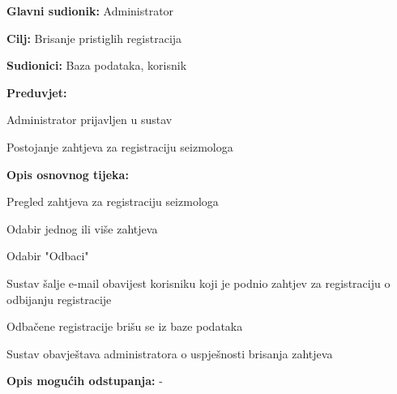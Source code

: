 					\noindent {}
					\begin{packed_item}
	
						\item \textbf{Glavni sudionik:} Administrator
						\item \textbf{Cilj:} Brisanje pristiglih registracija
						\item \textbf{Sudionici:} Baza podataka, korisnik
						\item \textbf{Preduvjet:} 
							\begin{packed_item}
								\item Administrator prijavljen u sustav
								\item Postojanje zahtjeva za registraciju seizmologa
							\end{packed_item}
						\item  \textbf{Opis osnovnog tijeka:}
						
						\item[] \begin{packed_enum}
	
							\item Pregled zahtjeva za registraciju seizmologa
							\item Odabir jednog ili više zahtjeva
							\item Odabir "Odbaci"
							\item Sustav šalje e-mail obavijest korisniku koji je podnio zahtjev za registraciju o odbijanju registracije
							\item Odbačene registracije brišu se iz baze podataka
							\item Sustav obavještava administratora o uspješnosti brisanja zahtjeva
							
						\end{packed_enum}
						
						\item  \textbf{Opis mogućih odstupanja:} - 
						
					\end{packed_item}

